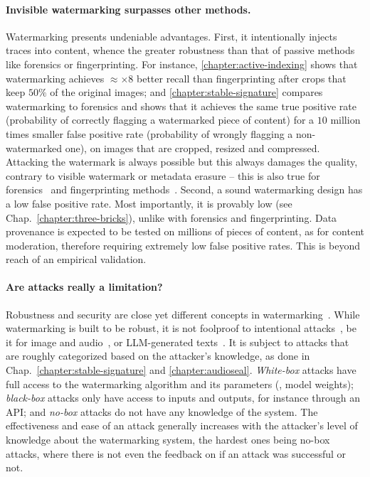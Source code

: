 \paragraph*{Invisible watermarking surpasses other methods.}
Watermarking presents undeniable advantages.
First, it intentionally injects traces into content, whence the greater robustness than that of passive methods like forensics or fingerprinting. 
For instance, \autoref{chapter:active-indexing} shows that watermarking achieves $\approx\times$8 better recall than fingerprinting after crops that keep $50\%$ of the original images;
and \autoref{chapter:stable-signature} compares watermarking to forensics and shows that it achieves the same true positive rate (probability of correctly flagging a watermarked piece of content) for a $10$ million times smaller false positive rate (probability of wrongly flagging a non-watermarked one), on images that are cropped, resized and compressed.
Attacking the watermark is always possible but this always damages the quality, contrary to visible watermark or metadata erasure -- this is also true for forensics~\citep{barni2018adversarial} and fingerprinting methods~\citep{tolias2019targeted}.
Second, a sound watermarking design has a low false positive rate.
Most importantly, it is provably low (see Chap.~\ref{chapter:three-bricks}), unlike with forensics and fingerprinting. 
Data provenance is expected to be tested on millions of pieces of content, as for content moderation, therefore requiring extremely low false positive rates. 
This is beyond reach of an empirical validation.  

\paragraph*{Are attacks really a limitation?}\label{conclusion:attacks}
Robustness and security are close yet different concepts in watermarking~\citep{cayre2005watermarking}.
While watermarking is built to be robust, it is not foolproof to intentional attacks~\citep{cox1998some, bas2011break}, be it for image and audio~\citep[\autoref{chapter:stable-signature}, \autoref{chapter:audioseal}]{jiang2023evading, zhao2023invisible, saberi2023robustness}, or LLM-generated texts~\citep{sadasivan2023can, krishna2024paraphrasing, hu2024stable, jovanovic2024watermark, pang2024attacking, chang2024watermark}.
It is subject to attacks that are roughly categorized based on the attacker's knowledge, as done in Chap.~\ref{chapter:stable-signature} and \ref{chapter:audioseal}.
\textit{White-box} attacks have full access to the watermarking algorithm and its parameters (\eg, model weights);
\textit{black-box} attacks only have access to inputs and outputs, for instance through an API;
and \textit{no-box} attacks do not have any knowledge of the system.
The effectiveness and ease of an attack generally increases with the attacker's level of knowledge about the watermarking system, the hardest ones being no-box attacks, where there is not even the feedback on if an attack was successful or not.

